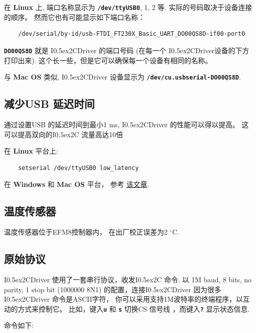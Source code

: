 \documentclass{article}
\newcommand{\two}{\raise0.5ex\hbox{\footnotesize{2}}}
\newcommand{\iic}{I\two{}C}
\newcommand{\iicdriver}{I\two{}CDriver}
\newcommand{\degc}{$^{\circ}$C}
\newcommand{\mach}[1]{\texttt{\textbf{#1}}}
\begin{document}
在 \textbf{Linux} 上, 端口名称显示为 \mach{/dev/ttyUSB0}, 1, 2 等.
实际的号码取决于设备连接的顺序。 然而它也有可能显示如下端口名称：
\begin{lstlisting}
    /dev/serial/by-id/usb-FTDI_FT230X_Basic_UART_DO00QS8D-if00-port0
\end{lstlisting}

\mach{DO00QS8D} 就是 \iicdriver{} 的端口号码 (在每一个 \iicdriver{}设备的下方打印出来).
这个长一些，但是它可以确保每一个设备有相同的名称。 

与 \textbf{Mac OS} 类似, \iicdriver{} 设备显示为 \mach{/dev/cu.usbserial-DO00QS8D}.

\subsection{减少USB 延迟时间}

通过设置USB 的延迟时间到最小1 ms, \iicdriver{} 的性能可以得以提高。 
这可以提高双向的\iic{} 流量高达10倍

在 \textbf{Linux} 平台上:

\begin{lstlisting}
    setserial /dev/ttyUSB0 low_latency
\end{lstlisting}

在 \textbf{Windows} 和 \textbf{Mac OS} 平台， 参考
\href{https://projectgus.com/2011/10/notes-on-ftdi-latency-with-arduino/}{该文章}.

\subsection{温度传感器}

温度传感器位于EFM8控制器内， 在出厂校正误差为2 \degc.


\newpage
\subsection{原始协议}

\iicdriver{} 使用了一套串行协议，收发\iic{} 命令.
以 1M baud, 8 bits, no parity, 1 stop bit (1000000 8N1) 的配置，连接\iicdriver{} 
因为很多 \iicdriver{}  命令是ASCII字符， 你可以采用支持1M波特率的终端程序，以互动的方式来控制它。
比如，键入\mach{u} 和 \mach{s} 切换CS 信号线 ，而键入\mach{?} 显示状态信息.

命令如下:
\end{document}
